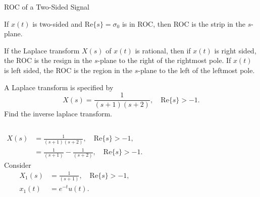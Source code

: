 \begin{frame}{ROC of a Two-Sided Signal}

    {
        If $x(t)$ is two-sided and $\mathrm{Re}\{s\} = \sigma_0$ is in ROC, then ROC is the strip in the $s$-plane.
    }
\end{frame}

\begin{frame}
    If the Laplace transform $X(s)$ of $x(t)$ is rational, then if $x(t)$ is right sided, the ROC is the resign in the $s$-plane to the right of the rightmost pole. If $x(t)$ is left sided, the ROC is the region in the $s$-plane to the left of the leftmost pole.
\end{frame}


\begin{frame}[t]{}
    \begin{example}
        A Laplace transform is specified by
        \begin{equation*}
            X(s) = \frac{1}{(s+1)(s+2)}, \quad \mathrm{Re}\{s\} > -1.
        \end{equation*}
        Find the inverse laplace transform.

        
    \end{example}
\end{frame}

\begin{frame}[t]{}
    {
            \begin{columns}
                    
                    \begin{align*}
                        X(s) &= \frac{1}{(s+1)(s+2)}, \quad \mathrm{Re}\{s\} > -1,\\
                        &= \frac{1}{(s+1)} - \frac{1}{(s+2)}, \quad \mathrm{Re}\{s\} > -1.
                    \end{align*}
                    \pause
                    Consider
                    \begin{align*}
                        X_1(s) &= \frac{1}{(s+1)}, \quad \mathrm{Re}\{s\} > -1,\\
                        x_1(t) &= e^{-t}u(t).
                    \end{align*}
            \end{columns}

    }
\end{frame}


